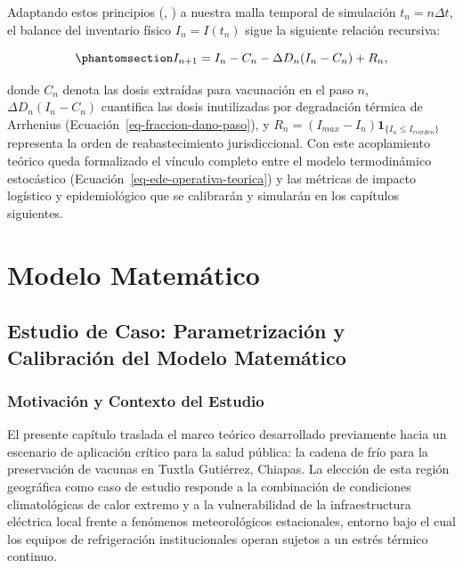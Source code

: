 \documentclass[
  spanish,
  us-letterpaper,
]{scrreprt}
\numberwithin{equation}{section}
\theoremstyle{plain}
\theoremstyle{plain}
\theoremstyle{plain}
\theoremstyle{definition}
\theoremstyle{remark}
\begin{document}
Adaptando estos principios (,
) a nuestra malla temporal de
simulación \(t_n = n\Delta t\), el balance del inventario físico
\(I_n = I(t_n)\) sigue la siguiente relación recursiva:

\begin{equation}\phantomsection\label{eq-balance-inventario-general}{
I_{n+1} = I_n - C_n - \Delta D_n (I_n - C_n) + R_n,
}\end{equation}

donde \(C_n\) denota las dosis extraídas para vacunación en el paso
\(n\), \(\Delta D_n (I_n - C_n)\) cuantifica las dosis inutilizadas por
degradación térmica de Arrhenius (Ecuación~\ref{eq-fraccion-dano-paso}),
y \(R_n = (I_{max} - I_n)\mathbf{1}_{\{I_n \le I_{reorden}\}}\)
representa la orden de reabastecimiento jurisdiccional. Con este
acoplamiento teórico queda formalizado el vínculo completo entre el
modelo termodinámico estocástico
(Ecuación~\ref{eq-ede-operativa-teorica}) y las métricas de impacto
logístico y epidemiológico que se calibrarán y simularán en los
capítulos siguientes.

\part{Modelo Matemático}

\chapter{Estudio de Caso: Parametrización y Calibración del Modelo
Matemático}\label{sec-estudio-caso}

\section{Motivación y Contexto del
Estudio}\label{sec-motivacion-contexto}

El presente capítulo traslada el marco teórico desarrollado previamente
hacia un escenario de aplicación crítico para la salud pública: la
cadena de frío para la preservación de vacunas en Tuxtla Gutiérrez,
Chiapas. La elección de esta región geográfica como caso de estudio
responde a la combinación de condiciones climatológicas de calor extremo
y a la vulnerabilidad de la infraestructura eléctrica local frente a
fenómenos meteorológicos estacionales, entorno bajo el cual los equipos
de refrigeración institucionales operan sujetos a un estrés térmico
continuo.
\end{document}
